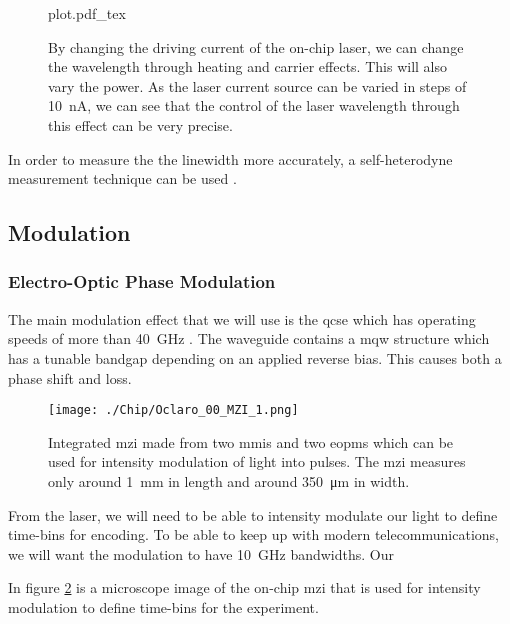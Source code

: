 \begin{figure}[tbp]
	\centering
	\def\svgwidth{\textwidth} 
	{plot.pdf_tex}
	\caption[Laser wavelength current sweep]{By changing the driving current of the on-chip laser, we can change the wavelength through heating and carrier effects. This will also vary the power. As the laser current source can be varied in steps of \SI{10}{\nA}, we can see that the control of the laser wavelength through this effect can be very precise.}
	\label{fig:curr_sweep}
\end{figure}

In order to measure the the linewidth more accurately, a self-heterodyne measurement technique can be used \cite{self-heterodyne}. 

\subsection{Modulation}

\subsubsection{Electro-Optic Phase Modulation}

The main modulation effect that we will use is the \ac{qcse} which has operating speeds of more than \SI{40}{GHz} \cite{qcse, smit2014}. The waveguide contains a \ac{mqw}  structure which has a tunable bandgap depending on an applied reverse bias. This causes both a phase shift and loss.

\begin{figure}[tbp]
	\centering
	\texttt{[image: ./Chip/Oclaro\_00\_MZI\_1.png]}
	\caption[Microscope image of an integrated Mach-Zehnder interferometer]{Integrated \acl{mzi} made from two \acsp{mmi} and two \acsp{eopm}  which can be used for intensity modulation of light into pulses. The \ac{mzi} measures only around \SI{1}{\mm} in length and around \SI{350}{\micro\metre} in width.}
	\label{fig:InP_MZI}
\end{figure}

From the laser, we will need to be able to intensity modulate our light to define time-bins for encoding. To be able to keep up with modern telecommunications, we will want the modulation to have \SI{10}{GHz} bandwidths. Our

In figure \ref{fig:InP_MZI} is a microscope image of the on-chip \ac{mzi} that is used for intensity modulation to define time-bins for the experiment.

